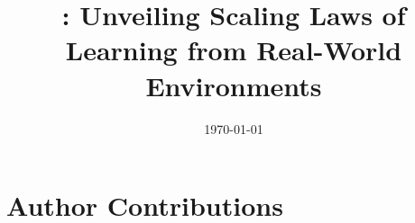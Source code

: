 \documentclass[]{bytedance_seed}
\title{\benchmark: Unveiling Scaling Laws of Learning from Real-World Environments}
\affiliation{ByteDance Seed}
\date{\today}
\theoremstyle{plain}
\theoremstyle{definition}
\theoremstyle{remark}
\newcommand{\1}{\mathds{1}}
\begin{document}
\maketitle










\clearpage
\section*{Author Contributions}

\newcommand{\contribrole}[2]{\noindent\textbf{#1}\nopagebreak\par#2\par\medskip}
\end{document}
